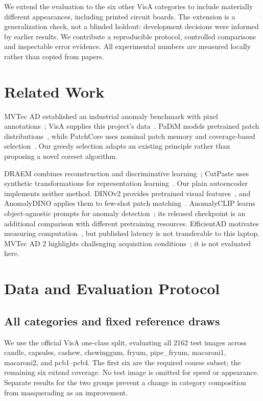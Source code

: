 \documentclass[10pt,twocolumn,letterpaper]{article}
\begin{document}
We extend the evaluation to the six other VisA categories to include materially different appearances, including printed circuit boards. The extension is a generalization check, not a blinded holdout: development decisions were informed by earlier results. We contribute a reproducible protocol, controlled comparisons and inspectable error evidence. All experimental numbers are measured locally rather than copied from papers.
\section{Related Work}
MVTec AD established an industrial anomaly benchmark with pixel annotations~\cite{mvtec}; VisA supplies this project's data~\cite{visa}. PaDiM models pretrained patch distributions~\cite{padim}, while PatchCore uses nominal patch memory and coverage-based selection~\cite{patchcore}. Our greedy selection adapts an existing principle rather than proposing a novel coreset algorithm.

DRAEM combines reconstruction and discriminative learning~\cite{draem}; CutPaste uses synthetic transformations for representation learning~\cite{cutpaste}. Our plain autoencoder implements neither method. DINOv2 provides pretrained visual features~\cite{dinov2}, and AnomalyDINO applies them to few-shot patch matching~\cite{anomalydino}. AnomalyCLIP learns object-agnostic prompts for anomaly detection~\cite{anomalyclip}; its released checkpoint is an additional comparison with different pretraining resources. EfficientAD motivates measuring computation~\cite{efficientad}, but published latency is not transferable to this laptop. MVTec AD 2 highlights challenging acquisition conditions~\cite{mvtec2}; it is not evaluated here.
\clearpage
\section{Data and Evaluation Protocol}
\subsection{All categories and fixed reference draws}
We use the official VisA one-class split, evaluating all 2162 test images across candle, capsules, cashew, chewinggum, fryum, pipe\_fryum, macaroni1, macaroni2, and pcb1--pcb4. The first six are the required course subset; the remaining six extend coverage. No test image is omitted for speed or appearance. Separate results for the two groups prevent a change in category composition from masquerading as an improvement.
\end{document}
